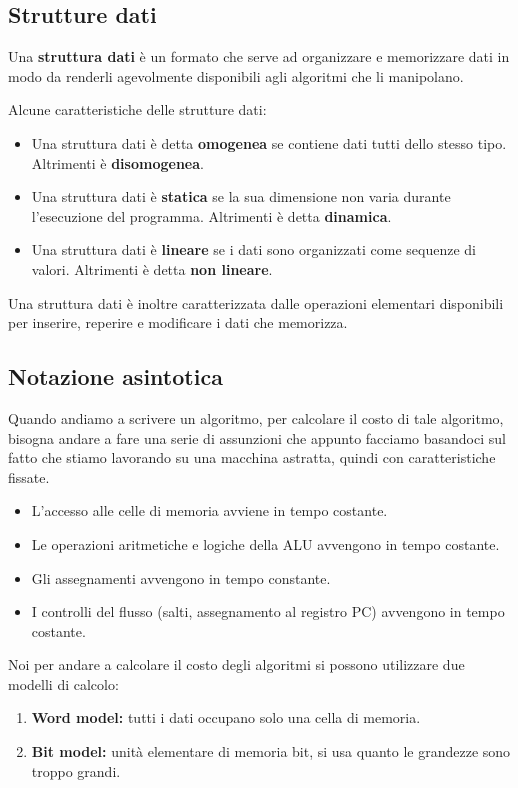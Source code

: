 \subsection{Strutture dati}
\begin{definition}
Una \textbf{struttura dati} è un formato che serve ad organizzare e memorizzare dati in modo da renderli agevolmente disponibili agli algoritmi che li manipolano.
\end{definition}
\hspace{-15pt}Alcune caratteristiche delle strutture dati:
\begin{itemize}
    \item Una struttura dati è detta \textbf{omogenea} se contiene dati tutti dello stesso tipo. Altrimenti è \textbf{disomogenea}.
    \item Una struttura dati è \textbf{statica} se la sua dimensione non varia durante l'esecuzione del programma. Altrimenti è detta \textbf{dinamica}.
    \item Una struttura dati è \textbf{lineare} se i dati sono organizzati come sequenze di valori. Altrimenti è detta \textbf{non lineare}.
\end{itemize}
Una struttura dati è inoltre caratterizzata dalle operazioni elementari disponibili per inserire, reperire e modificare i dati che memorizza.

\subsection{Notazione asintotica}
Quando andiamo a scrivere un algoritmo, per calcolare il costo di tale algoritmo, bisogna andare a fare una serie di assunzioni che appunto facciamo basandoci sul fatto che stiamo lavorando su una macchina astratta, quindi con caratteristiche fissate.
\begin{itemize}
    \item L'accesso alle celle di memoria avviene in tempo costante.
    \item Le operazioni aritmetiche e logiche della ALU avvengono in tempo costante.
    \item Gli assegnamenti avvengono in tempo constante.
    \item I controlli del flusso (salti, assegnamento al registro PC) avvengono in tempo costante.
\end{itemize}
Noi per andare a calcolare il costo degli algoritmi si possono utilizzare due modelli di calcolo:
\begin{enumerate}
    \item \textbf{Word model:} tutti i dati occupano solo una cella di memoria.
    \item \textbf{Bit model:} unità elementare di memoria bit, si usa quanto le grandezze sono troppo grandi.
\end{enumerate}

